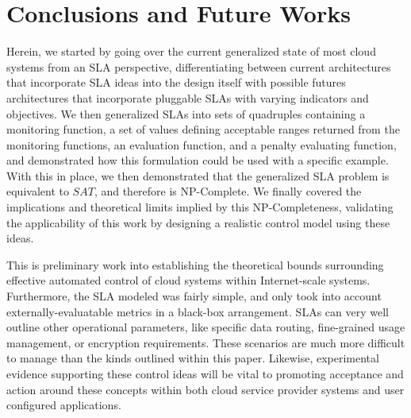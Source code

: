 \section{Conclusions and Future Works}
\noindent Herein, we started by going over the current generalized state of most cloud systems from an SLA perspective, differentiating between current architectures that incorporate SLA ideas into the design itself with possible futures architectures that incorporate pluggable SLAs with varying indicators and objectives.  We then generalized SLAs into sets of quadruples containing a monitoring function, a set of values defining acceptable ranges returned from the monitoring functions, an evaluation function, and a penalty evaluating function, and demonstrated how this formulation could be used with a specific example.  With this in place, we then demonstrated that the generalized SLA problem is equivalent to $ SAT $, and therefore is NP-Complete.  We finally covered the implications and theoretical limits implied by this NP-Completeness, validating the applicability of this work by designing a realistic control model using these ideas.

This is preliminary work into establishing the theoretical bounds surrounding effective automated control of cloud systems within Internet-scale systems.  Furthermore, the SLA modeled was fairly simple, and only took into account externally-evaluatable metrics in a black-box arrangement.  SLAs can very well outline other operational parameters, like specific data routing, fine-grained usage management, or encryption requirements.  These scenarios are much more difficult to manage than the kinds outlined within this paper.  Likewise, experimental evidence supporting these control ideas will be vital to promoting acceptance and action around these concepts within both cloud service provider systems and user configured applications.